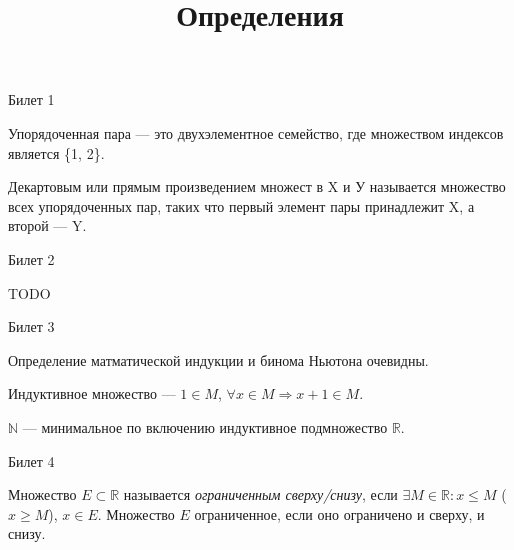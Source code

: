 \documentclass[12pt,a4paper]{article}
\title{Определения}
\begin{document}
\begin{center}
Билет 1
\end{center}

Упорядоченная пара --- это двухэлементное семейство, где множеством индексов является \{1, 2\}.

Декартовым или прямым произведением множест в X и У называется множество всех упорядоченных пар, таких что первый элемент пары принадлежит X, а второй --- Y.

\begin{center}
Билет 2
\end{center}

TODO

\begin{center}
Билет 3
\end{center}

Определение матматической индукции и бинома Ньютона очевидны.

Индуктивное множество --- $1 \in M$, $\forall x \in M \Rightarrow x+1 \in M$.

$\mathbb{N}$ --- минимальное по включению индуктивное подмножество $\mathbb{R}$. 

\begin{center}
Билет 4
\end{center}

Множество $E \subset \mathbb{R}$ называется \textit{ограниченным сверху/снизу}, если $\exists M \in \mathbb{R}: x \leq M$ ($x \geq M$), $x \in E$. Множество $E$ ограниченное, если оно ограничено и сверху, и снизу.
\end{document}

